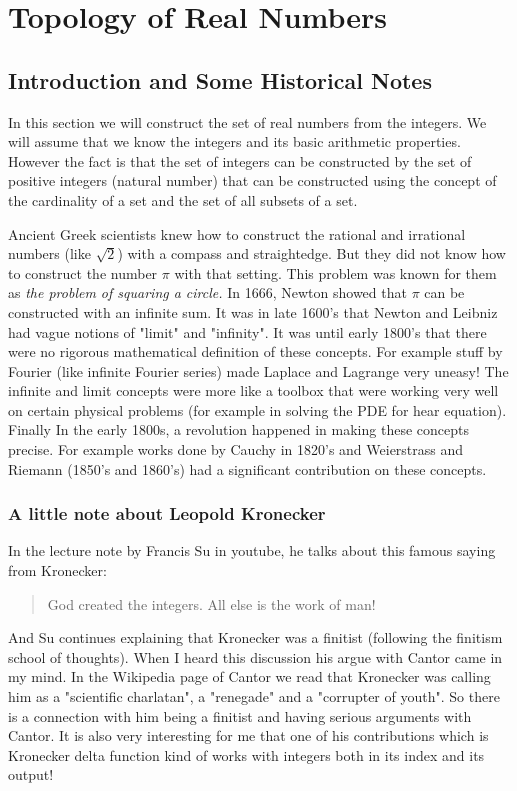 \section{Topology of Real Numbers}
 

\subsection{Introduction and Some Historical Notes}

In this section we will construct the set of real numbers from the integers. We will assume that we know the integers and its basic arithmetic properties. However the fact is that the set of integers can be constructed by the set of positive integers (natural number) that can be constructed using the concept of the cardinality of a set and the set of all subsets of a set.

Ancient Greek scientists knew how to construct the rational and irrational numbers (like $ \sqrt{2} $) with a compass and straightedge. But they did not know how to construct the number $\pi $ with that setting. This problem was known for them as \emph{the problem of squaring a circle.} In 1666, Newton showed that $ \pi $ can be constructed with an infinite sum. It was in late 1600's that Newton and Leibniz had vague notions of "limit" and "infinity". It was until early 1800's that there were no rigorous mathematical definition of these concepts. For example stuff by Fourier (like infinite Fourier series) made Laplace and Lagrange very uneasy! The infinite and limit concepts were more like a toolbox that were working very well on certain physical problems (for example in solving the PDE for hear equation). Finally In the early 1800s, a revolution happened in making these concepts precise. For example works done by Cauchy in 1820's and Weierstrass and Riemann (1850's and 1860's) had a significant contribution on these concepts.  

\subsubsection{A little note about Leopold Kronecker}

In the lecture note by Francis Su in youtube, he talks about this famous saying from Kronecker:
\begin{quote}
	God created the integers. All else is the work of man!
\end{quote}

And Su continues explaining that Kronecker was a finitist (following the finitism school of thoughts). When I heard this discussion his argue with Cantor came in my mind. In the Wikipedia page of Cantor we read that Kronecker was calling him as a "scientific charlatan", a "renegade" and a "corrupter of youth". So there is a connection with him being a finitist and having serious arguments with Cantor. It is also very interesting for me that one of his contributions which is Kronecker delta function kind of works with integers both in its index and its output!

